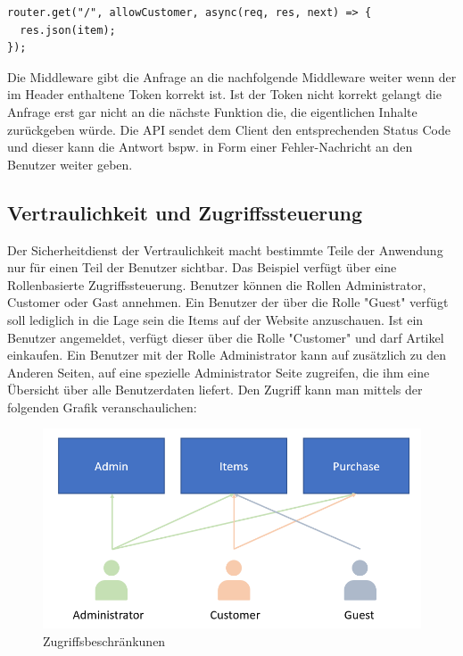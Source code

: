 \documentclass[utf8,biblatex]{lni}
\begin{document}
\begin{verbatim}
router.get("/", allowCustomer, async(req, res, next) => {
  res.json(item);
});
\end{verbatim}

Die Middleware gibt die Anfrage an die nachfolgende Middleware weiter wenn der im Header enthaltene 
Token korrekt ist. Ist der Token nicht korrekt gelangt die Anfrage erst gar nicht an die nächste Funktion die,
die eigentlichen Inhalte zurückgeben würde. 
Die API sendet dem Client den entsprechenden Status Code und dieser kann die Antwort bspw. in Form 
einer Fehler-Nachricht an den Benutzer weiter geben. 

\subsection{Vertraulichkeit und Zugriffssteuerung}

Der Sicherheitdienst der Vertraulichkeit macht bestimmte Teile der Anwendung nur für einen Teil der Benutzer sichtbar. 
Das Beispiel verfügt über eine Rollenbasierte Zugriffssteuerung. 
Benutzer können die Rollen Administrator, Customer oder Gast annehmen.
Ein Benutzer der über die Rolle "Guest" verfügt soll lediglich in die Lage sein die Items auf der Website anzuschauen. 
Ist ein Benutzer angemeldet, verfügt dieser über die Rolle "Customer" und darf Artikel einkaufen. 
Ein Benutzer mit der Rolle Administrator kann auf zusätzlich zu den Anderen Seiten, auf eine spezielle Administrator Seite zugreifen, die ihm eine Übersicht über 
alle Benutzerdaten liefert. 
Den Zugriff kann man mittels der folgenden Grafik veranschaulichen:

\begin{figure}
  \centering
  \includegraphics[width=\textwidth]{images/access.png}
  \caption[Zugriffsbeschränkunen]{Zugriffsbeschränkunen} 
  \label{access-desc}
\end{figure} 
\end{document}
